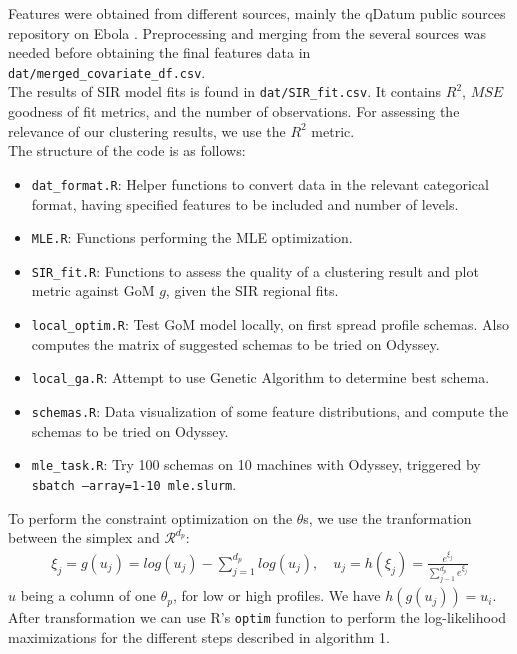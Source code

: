 \documentclass[twoside]{article}
\begin{document}
Features were obtained from different sources, mainly the qDatum public sources repository on Ebola \cite{source}. Preprocessing and merging from the several sources was needed before obtaining the final features data in \texttt{dat/merged\_covariate\_df.csv}.\\
\indent
The results of SIR model fits is found in \texttt{dat/SIR\_fit.csv}. It contains $R^2$, $MSE$ goodness of fit metrics, and the number of observations. For assessing the relevance of our clustering results, we use the $R^2$ metric.\\

The structure of the code is as follows:
\begin{itemize}
\item \texttt{dat\_format.R}: Helper functions to convert data in the relevant categorical format, having specified features to be included and number of levels.
\item \texttt{MLE.R}: Functions performing the MLE optimization.
\item \texttt{SIR\_fit.R}: Functions to assess the quality of a clustering result and plot metric against GoM $g$, given the SIR regional fits.
\item \texttt{local\_optim.R}: Test GoM model locally, on first spread profile schemas. Also computes the matrix of suggested schemas to be tried on Odyssey.
\item \texttt{local\_ga.R}: Attempt to use Genetic Algorithm to determine best schema.
\item \texttt{schemas.R}: Data visualization of some feature distributions, and compute the schemas to be tried on Odyssey.
\item \texttt{mle\_task.R}: Try 100 schemas on 10 machines with Odyssey, triggered by \texttt{sbatch --array=1-10 mle.slurm}.
\end{itemize}

To perform the constraint optimization on the $\theta$s, we use the tranformation between the simplex and $\mathcal{R}^{d_p}$:
\begin{align*}
\xi_j = g(u_j) = log(u_j) - \sum_{j=1}^{d_p} log(u_j), \quad u_j = h(\xi_j) = \frac{e^{\xi_j}}{\sum_{j-1}^{d_p} e^{\xi_j}}
\end{align*}
$u$ being a column of one $\theta_p$, for low or high profiles. We have $h(g(u_j)) = u_i$. After transformation we can use R's \texttt{optim} function to perform the log-likelihood maximizations for the different steps described in algorithm 1.\\
\end{document}
